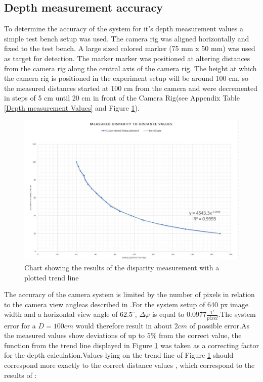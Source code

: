 \subsection{Depth measurement accuracy}
To determine the accuracy of the system for it's depth measurement values a simple test bench setup was used. The camera rig was aligned horizontally and fixed to the test bench. A large sized colored marker (75 mm x 50 mm) was used as target for detection. The marker marker was positioned at altering distances from the camera rig along the central axis of the camera rig. The height at which the camera rig is positioned in the experiment setup will be around 100 cm, so the measured distances started at 100 cm from the camera and were decremented in steps of 5 cm until 20 cm in front of the Camera Rig(see Appendix Table \ref{Depth measurement Values} and Figure \ref{char:DisparityToDistanceChart}).
\begin{figure}[H]
\includegraphics[width=\columnwidth]{images/Disparity_to_distance.JPG}
\caption{Chart showing the results of the disparity measurement with a plotted trend line}
\label{char:DisparityToDistanceChart} 
\end{figure}
The accuracy of the camera system is limited by the number of pixels in relation to the camera view angleas described in \cite{JernejMrovlje.2008}.For the system setup of 640 px image width and a horizontal view angle of $62.5^\circ$, $\Delta\varphi$ is equal to $0.0977\frac{1^\circ}{pixel}$.The system error for a $D=100cm$ would therefore result in about $2cm$ of possible error.As the measured values show deviations of up to $5\%$ from the correct value, the function from the trend line displayed in Figure \ref{char:DisparityToDistanceChart} was taken as a correcting factor for the depth calculation.Values lying on the trend line of Figure \ref{char:DisparityToDistanceChart} should correspond more exactly to the correct distance values \cite{ManafA.Mahammed.2013}, which correspond to the results of :

